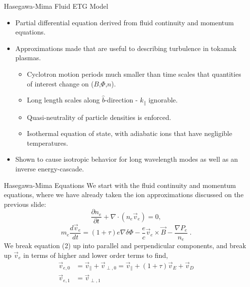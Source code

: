 \documentclass[aspectratio=43]{beamer}
\begin{document}
   \begin{frame}{Hasegawa-Mima Fluid ETG Model}
      \begin{itemize}
         \item Partial differential equation derived from fluid continuity and momentum equations.
         \item Approximations made that are useful to describing  turbulence in tokamak plasmas.
         \begin{itemize}
            \item Cyclotron motion periods much smaller than time scales that quantities of interest change on ($B$,$\Phi$,$n$).
            \item Long length scales along $\hat{b}$-direction - $k_{\parallel}$ ignorable.
            \item Quasi-neutrality of particle densities is enforced.
            \item Isothermal equation of state, with adiabatic ions that have negligible temperatures.
         \end{itemize}
         \item Shown to cause isotropic behavior for long wavelength modes as well as an inverse energy-cascade.
      \end{itemize}
   \end{frame}

   \begin{frame}{Hasegawa-Mima Equations}
      \quad We start with the fluid continuity and momentum equations, where we have already taken the ion approximations discussed
   on the previous slide:
      \begin{equation}
         \frac{\partial n_e}{\partial t} + \nabla\cdot\left(n_e\vec{v}_e\right) = 0,
      \end{equation}
      \begin{equation}
            m_e\frac{d\vec{v}_e}{dt} = \left(1+\tau\right)e\nabla\delta\Phi - \frac{e}{c}\vec{v}_e\times\vec{B}-\frac{\nabla P_e}{n_e}\;.
      \end{equation}
   We break equation (2) up into parallel and perpendicular components, and break up $\vec{v}_e$ in terms of higher and lower order terms to find,
      \begin{equation}
      \begin{aligned}
         \vec{v}_{e,0} &= \vec{v}_{\parallel} + \vec{v}_{\perp,0} = \vec{v}_{\parallel} + \left(1 + \tau\right)\vec{v}_E + \vec{v}_D \\
         \vec{v}_{e,1} &= \vec{v}_{\perp,1}
      \end{aligned}
      \end{equation}
   \end{frame}
\end{document}
